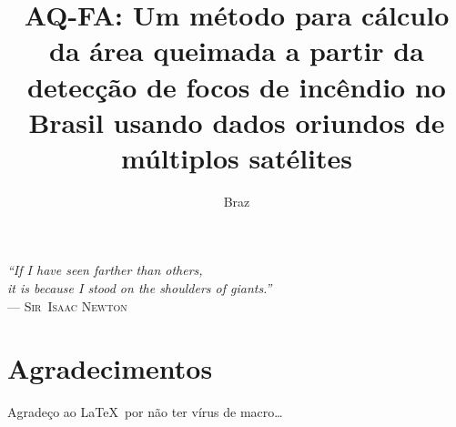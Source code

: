 \documentclass[cic,tc]{iiufrgs}
\title{AQ-FA: Um método para cálculo da área queimada a partir da detecção de focos de incêndio no Brasil usando dados oriundos de múltiplos satélites}
\author{Braz}{José Henrique da Silva}
\begin{document}
\maketitle

\clearpage
\begin{flushright}
\mbox{}\vfill
{\sffamily\itshape
``If I have seen farther than others,\\
it is because I stood on the shoulders of giants.''\\}
--- \textsc{Sir~Isaac Newton}
\end{flushright}

\chapter*{Agradecimentos}
Agradeço ao \LaTeX\ por não ter vírus de macro\ldots

\tableofcontents
\end{document}
